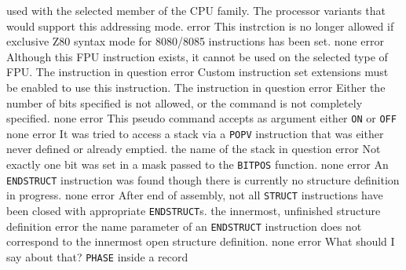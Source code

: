 \documentclass[12pt,twoside]{report}
\newcommand{\tty}[1]{{\tt #1}}
\begin{document}
\begin{description}
{                used with the selected member of the CPU family.}
               {The processor variants that would support this
                addressing mode.}
               {error}
               {This instrction is no longer allowed if exclusive
                Z80 syntax mode for 8080/8085 instructions has been set.}
               {none}
               {error}
               {Although this FPU instruction exists, it cannot be used on
                the selected type of FPU.}
               {The instruction in question}
               {error}
               {Custom instruction set extensions must be enabled
                to use this instruction.}
               {The instruction in question}
               {error}
               {Either the number of bits specified is not allowed, or
                the command is not completely specified.}
               {none}
               {error}
               {This pseudo command accepts as argument either \tty{ON} or
                \tty{OFF}}
               {none}
               {error}
               {It was tried to access a stack via a \tty{POPV} instruction
                that was either never defined or already emptied.}
               {the name of the stack in question}
               {error}
               {Not exactly one bit was set in a mask passed to the
                \tty{BITPOS} function.}
               {none}
               {error}
               {An \tty{ENDSTRUCT} instruction was found though there is
                currently no structure definition in progress.}
               {none}
               {error}
               {After end of assembly, not all \tty{STRUCT} instructions
                have been closed with appropriate \tty{ENDSTRUCT}s.}
               {the innermost, unfinished structure definition}
               {error}
               {the name parameter of an \tty{ENDSTRUCT} instruction does
                not correspond to the innermost open structure
                definition.}
               {none}
               {error}
               {What should I say about that?  \tty{PHASE} inside a record
}
\end{description}
\end{document}

